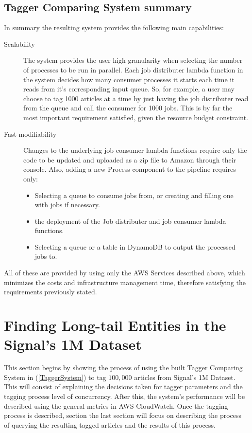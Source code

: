  
\subsection{Tagger Comparing System summary}
In summary the resulting system provides the following main capabilities:
\begin{description}
\item[Scalability]
The system provides the user high granularity when selecting the number of processes to be run in parallel.
Each job distributer lambda function in the system decides how many consumer processes it starts each time it reads from it's corresponding input queue. 
So, for example, a user may choose to tag 1000 articles at a time by just having the job distributer read from the queue and call the consumer for 1000 jobs.
This is by far the most important requirement satisfied, given the resource budget constraint.
\item[Fast modifiability]
Changes to the underlying job consumer lambda functions require only the code to be updated and uploaded as a zip file to Amazon through their console.
Also, adding a new Process component to the pipeline requires only:
  \begin{itemize}
  \item
  Selecting a queue to consume jobs from, or creating and filling one with jobs if necessary.
  \item
  the deployment of the Job distributer and job consumer lambda functions.
  \item
  Selecting a queue or a table in DynamoDB to output the processed jobs to.
  \end{itemize}
\end{description}
All of these are provided by using only the AWS Services described above, which  minimizes the costs and infrastructure management time,
therefore satisfying the requirements previously stated. 

\section{Finding Long-tail Entities in the Signal's 1M Dataset}\label{Contrib:LongTailInSignal}
This section begins by showing the process of using the built Tagger Comparing System in (\ref{TaggerSystem}) to tag $100,000$ articles from Signal's 1M Dataset.
This will consist of explaining the decisions taken for tagger parameters and the tagging process level of concurrency.
After this, the system's performance will be described using the general metrics in AWS CloudWatch\cite{aws_cloudwatch}.
Once the tagging process is described, section the last section will focus on describing the process of querying the resulting tagged articles and the results of this process. 

